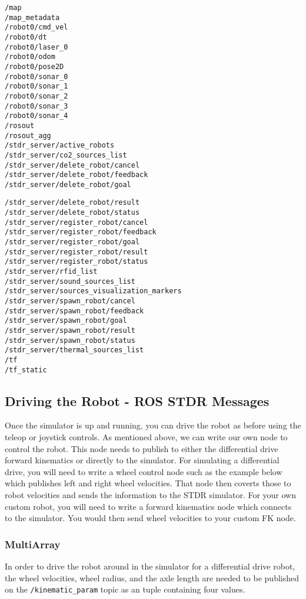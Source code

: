 \begin{verbatim}
/map
/map_metadata
/robot0/cmd_vel
/robot0/dt
/robot0/laser_0
/robot0/odom
/robot0/pose2D
/robot0/sonar_0
/robot0/sonar_1
/robot0/sonar_2
/robot0/sonar_3
/robot0/sonar_4
/rosout
/rosout_agg
/stdr_server/active_robots
/stdr_server/co2_sources_list
/stdr_server/delete_robot/cancel
/stdr_server/delete_robot/feedback
/stdr_server/delete_robot/goal
\end{verbatim}

\begin{verbatim}
/stdr_server/delete_robot/result
/stdr_server/delete_robot/status
/stdr_server/register_robot/cancel
/stdr_server/register_robot/feedback
/stdr_server/register_robot/goal
/stdr_server/register_robot/result
/stdr_server/register_robot/status
/stdr_server/rfid_list
/stdr_server/sound_sources_list
/stdr_server/sources_visualization_markers
/stdr_server/spawn_robot/cancel
/stdr_server/spawn_robot/feedback
/stdr_server/spawn_robot/goal
/stdr_server/spawn_robot/result
/stdr_server/spawn_robot/status
/stdr_server/thermal_sources_list
/tf
/tf_static
\end{verbatim}

\hypertarget{driving-the-robot---ros-stdr-messages}{%
\subsection{Driving the Robot - ROS STDR
Messages}\label{driving-the-robot---ros-stdr-messages}}

Once the simulator is up and running, you can drive the robot as before
using the teleop or joystick controls. As mentioned above, we can write
our own node to control the robot. This node needs to publish to either
the differential drive forward kinematics or directly to the simulator.
For simulating a differential drive, you will need to write a wheel
control node such as the example below which publishes left and right
wheel velocities. That node then coverts those to robot velocities and
sends the information to the STDR simulator. For your own custom robot,
you will need to write a forward kinematics node which connects to the
simulator. You would then send wheel velocities to your custom FK node.

\hypertarget{multiarray}{%
\subsubsection{MultiArray}\label{multiarray}}

In order to drive the robot around in the simulator for a differential
drive robot, the wheel velocities, wheel radius, and the axle length are
needed to be published on the \texttt{/kinematic\_param} topic as an
tuple containing four values.

